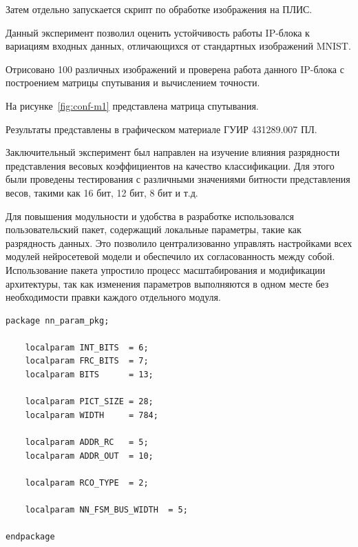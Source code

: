 Затем отдельно запускается скрипт по обработке изображения на ПЛИС.

Данный эксперимент позволил оценить устойчивость работы IP-блока к вариациям 
входных данных, отличающихся от стандартных изображений MNIST. 

Отрисовано 100 различных изображений и проверена работа данного IP-блока с 
построением матрицы спутывания и вычислением точности.

На рисунке~\ref{fig:conf-m1} представлена матрица спутывания.


Результаты представлены в графическом материале ГУИР 431289.007 ПЛ.

\anonsection{}Заключительный эксперимент был направлен на изучение влияния 
разрядности представления весовых коэффициентов на качество классификации. Для 
этого были проведены тестирования с различными значениями битности 
представления весов, такими как 16 бит, 12 бит, 8 бит и т.д.

Для повышения модульности и удобства в разработке 
использовался пользовательский пакет, содержащий локальные параметры, такие как 
разрядность данных. Это позволило централизованно управлять настройками всех 
модулей нейросетевой модели и обеспечило их согласованность между собой. 
Использование пакета упростило процесс масштабирования и модификации 
архитектуры, так как изменения параметров выполняются в одном месте без 
необходимости правки каждого отдельного модуля.

\small
\fontsize{12pt}{12pt}\selectfont
\begin{verbatim}
package nn_param_pkg;

    localparam INT_BITS  = 6;
    localparam FRC_BITS  = 7;
    localparam BITS      = 13;
    
    localparam PICT_SIZE = 28;
    localparam WIDTH     = 784;
  
    localparam ADDR_RC   = 5;
    localparam ADDR_OUT  = 10;
  
    localparam RCO_TYPE  = 2;
  
    localparam NN_FSM_BUS_WIDTH  = 5;
      
endpackage
\end{verbatim}
\normalsize
\fontsize{14pt}{14pt}\selectfont

